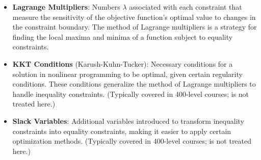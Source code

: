 \begin{itemize}
    \item \textbf{Lagrange Multipliers}: Numbers \(\lambda\) associated with each constraint that measure the sensitivity of the objective function's optimal value to changes in the constraint boundary. The method of Lagrange multipliers is a strategy for finding the local maxima and minima of a function subject to equality constraints.
    
    \item \textbf{KKT Conditions} (Karush-Kuhn-Tucker): Necessary conditions for a solution in nonlinear programming to be optimal, given certain regularity conditions. These conditions generalize the method of Lagrange multipliers to handle inequality constraints. (Typically covered in 400-level courses; is not treated here.)
    
    \item \textbf{Slack Variables}: Additional variables introduced to transform inequality constraints into equality constraints, making it easier to apply certain optimization methods. (Typically covered in 400-level courses; is not treated here.)
\end{itemize}

